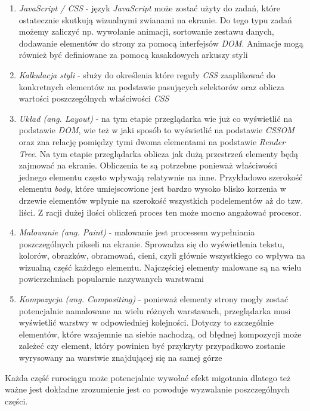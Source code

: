 \documentclass[polish, twoside, 12pt]{mwart}
\begin{document}
\begin{enumerate}
  \item \emph{JavaScript / CSS} - język \emph{JavaScript} może zostać użyty do zadań, które ostatecznie skutkują wizualnymi zwianami na ekranie. Do tego typu zadań możemy zaliczyć np. wywołanie animacji, sortowanie zestawu danych, dodawanie elementów do strony za pomocą interfejsów \emph{DOM}. Animacje mogą również być definiowane za pomocą kasakdowych arkuszy styli
  \item \emph{Kalkulacja styli} - służy do określenia które reguły \emph{CSS} zaaplikować do konkretnych elementów na podstawie pasujących selektorów oraz oblicza wartości poszczególnych właściwości \emph{CSS}
  \item \emph{Układ (ang. Layout)} - na tym etapie przeglądarka wie już co wyświetlić na podstawie \emph{DOM}, wie też w jaki sposób to wyświetlić na podstawie \emph{CSSOM} oraz zna relację pomiędzy tymi dwoma elementami na podstawie \emph{Render Tree}. Na tym etapie przeglądarka oblicza jak dużą przestrzeń elementy będą zajmować na ekranie. Obliczenia te są potrzebne ponieważ właściwości jednego elementu często wpływają relatywnie na inne. Przykładowo szerokość elementu \emph{body}, które umiejscowione jest bardzo wysoko blisko korzenia w drzewie elementów wpłynie na szerokość wszystkich podelementów aż do tzw. liści. Z racji dużej ilości obliczeń proces ten może mocno angażować procesor.
  \item \emph{Malowanie (ang. Paint)} - malowanie jest processem wypełniania poszczególnych pikseli na ekranie. Sprowadza się do wyświetlenia tekstu, kolorów, obrazków, obramowań, cieni, czyli głównie wszystkiego co wpływa na wizualną część każdego elementu. Najczęściej elementy malowane są na wielu powierzchniach popularnie nazywanych warstwami
  \item \emph{Kompozycja (ang. Compositing)} - ponieważ elementy strony mogły zostać potencjalnie namalowane na wielu różnych warstawach, przeglądarka musi wyświetlić warstwy w odpowiedniej kolejności. Dotyczy to szczególnie elementów, które wzajemnie na siebie nachodzą, od błędnej kompozycji może zależeć czy element, który powinien być przykryty przypadkowo zostanie wyrysowany na warstwie znajdującej się na samej górze
\end{enumerate}

Każda część rurociągu może potencjalnie wywołać efekt migotania dlatego też ważne jest dokładne zrozumienie jest co powoduje wyzwalanie poszczególnych części.
\end{document}
